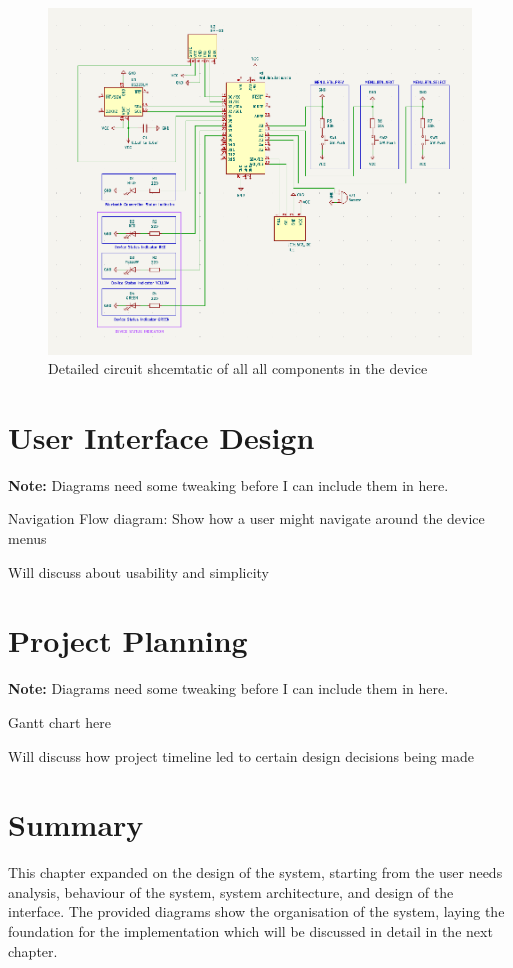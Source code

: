 \begin{figure}[H]
\centering
\includegraphics[scale=0.6]{images/schematic_rev2}
\caption{Detailed circuit shcemtatic of all all components in the device}
\label{fig:circuit_diagram}
\end{figure}

\section{User Interface Design} %
\textbf{Note:} Diagrams need some tweaking before I can include them in here.

Navigation Flow diagram: Show how a user might navigate around the device menus

Will discuss about usability and simplicity

\section{Project Planning} %
\textbf{Note:} Diagrams need some tweaking before I can include them in here.

Gantt chart here

Will discuss how project timeline led to certain design decisions being made

\section{Summary} %
This chapter expanded on the design of the system, starting from the user needs analysis, behaviour of the system, system architecture, and design of the interface. The provided diagrams show the organisation of the system, laying the foundation for the implementation which will be discussed in detail in the next chapter.
